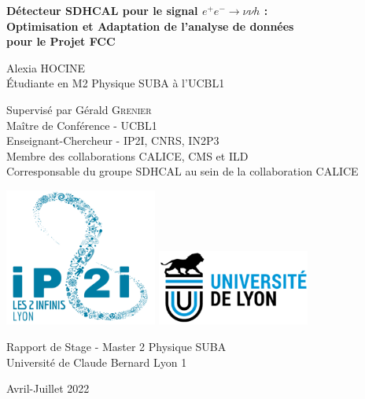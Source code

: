
\begin{titlepage}
	\begin{center}
		
    		\vspace*{3cm}

    		\LARGE
    		\textbf{Détecteur SDHCAL pour le signal  $ e^{+} e^{-} \longrightarrow \nu \nu h $ :\\Optimisation et Adaptation de l'analyse de données\\pour le Projet FCC}

    		\vspace{1.5cm}

    		Alexia \textsc{HOCINE}\\
    		\vspace{0.4cm}
    		\large 
    			Étudiante en M2 Physique SUBA à l'UCBL1
    		
		\vspace{1.5cm}
		\Large
		Supervisé par Gérald \textsc{Grenier}\\
    		\vspace{0.4cm}
    		\large 
    			Maître de Conférence - UCBL1\\
    			Enseignant-Chercheur - IP2I, CNRS, IN2P3\\
    			Membre des collaborations CALICE, CMS et ILD\\
    			Corresponsable du groupe SDHCAL au sein de la collaboration CALICE

    		\vfill

		\includegraphics[width=5cm]{../img/Logo_IP2I.png}
 		\includegraphics[width=5cm]{../img/UdL-logo.png}

		\vspace{3cm} 

    		Rapport de Stage - Master 2 Physique SUBA\\
    		Université de Claude Bernard Lyon 1 \\    		

    		\vspace{1.5cm}
    		
    		Avril-Juillet 2022
    
 		
	\end{center}

\end{titlepage}